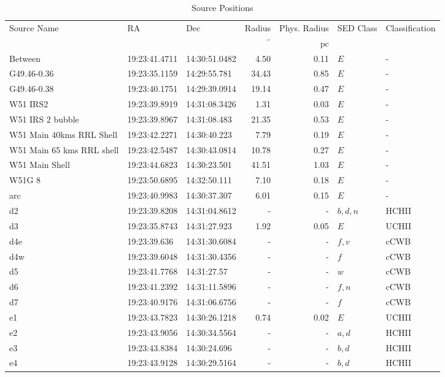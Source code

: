 \begin{table*}[htp]
\caption{Source Positions}
\begin{tabular}{lllrrll}
\label{tab:positions}
Source Name & RA & Dec & Radius & Phys. Radius & SED Class & Classification \\
 &  &  & $\mathrm{{}^{\prime\prime}}$ & $\mathrm{pc}$ &  &  \\
\hline
Between & 19:23:41.4711 & 14:30:51.0482 & 4.50 & 0.11 & $E$ & - \\
G49.46-0.36 & 19:23:35.1159 & 14:29:55.781 & 34.43 & 0.85 & $E$ & - \\
G49.46-0.38 & 19:23:40.1751 & 14:29:39.0914 & 19.14 & 0.47 & $E$ & - \\
W51 IRS2 & 19:23:39.8919 & 14:31:08.3426 & 1.31 & 0.03 & $E$ & - \\
W51 IRS 2 bubble & 19:23:39.8967 & 14:31:08.483 & 21.35 & 0.53 & $E$ & - \\
W51 Main 40kms RRL Shell & 19:23:42.2271 & 14:30:40.223 & 7.79 & 0.19 & $E$ & - \\
W51 Main 65 kms RRL shell & 19:23:42.5487 & 14:30:43.0814 & 10.78 & 0.27 & $E$ & - \\
W51 Main Shell & 19:23:44.6823 & 14:30:23.501 & 41.51 & 1.03 & $E$ & - \\
W51G 8 & 19:23:50.6895 & 14:32:50.111 & 7.10 & 0.18 & $E$ & - \\
arc & 19:23:40.9983 & 14:30:37.307 & 6.01 & 0.15 & $E$ & - \\
d2 & 19:23:39.8208 & 14:31:04.8612 & - & - & $b,d,n$ & HCHII \\
d3 & 19:23:35.8743 & 14:31:27.923 & 1.92 & 0.05 & $E$ & UCHII \\
d4e & 19:23:39.636 & 14:31:30.6084 & - & - & $f,v$ & cCWB \\
d4w & 19:23:39.6048 & 14:31:30.4356 & - & - & $f$ & cCWB \\
d5 & 19:23:41.7768 & 14:31:27.57 & - & - & $w$ & cCWB \\
d6 & 19:23:41.2392 & 14:31:11.5896 & - & - & $f,n$ & cCWB \\
d7 & 19:23:40.9176 & 14:31:06.6756 & - & - & $f$ & cCWB \\
e1 & 19:23:43.7823 & 14:30:26.1218 & 0.74 & 0.02 & $E$ & UCHII \\
e2 & 19:23:43.9056 & 14:30:34.5564 & - & - & $a,d$ & HCHII \\
e3 & 19:23:43.8384 & 14:30:24.696 & - & - & $b,d$ & HCHII \\
e4 & 19:23:43.9128 & 14:30:29.5164 & - & - & $b,d$ & HCHII \\

\end{tabular}
\end{table*}
